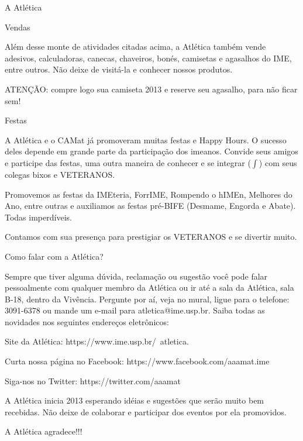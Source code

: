 \begin{secao}{A Atlética}
\begin{subsecao}{Vendas}

Além desse monte de atividades citadas acima, a Atlética também vende
adesivos, calculadoras, canecas, chaveiros, bonés, camisetas e agasalhos do IME,
 entre outros. Não deixe de visitá-la e conhecer nossos produtos.

ATENÇÃO: compre logo sua camiseta 2013 e reserve seu agasalho, para não ficar 
sem!

\end{subsecao}
\begin{subsecao}{Festas}

A Atlética e o CAMat já promoveram muitas festas e Happy Hours. O sucesso
deles depende em grande parte da participação dos imeanos. Convide seus
amigos e participe das festas, uma outra maneira de conhecer e se
integrar ($\int$) com seus colegas bixos e VETERANOS.

Promovemos as festas da IMEteria, ForrIME, Rompendo o hIMEn, Melhores do Ano, 
entre outras e auxiliamos as festas pré-BIFE (Desmame, Engorda e Abate). Todas 
imperdíveis.

Contamos com sua presença para prestigiar os VETERANOS e se divertir muito.

\end{subsecao}
\begin{subsecao}{Como falar com a Atlética?}

Sempre que tiver alguma dúvida, reclamação ou sugestão você pode falar
pessoalmente com qualquer membro da Atlética ou ir até a sala da Atlética, sala
B-18, dentro da Vivência. Pergunte por aí, veja no mural, ligue para o
telefone: 3091-6378 ou mande um e-mail para atletica@ime.usp.br.
Saiba todas as novidades nos seguintes endereços eletrônicos:

Site da Atlética: https://www.ime.usp.br/~atletica.

Curta nossa página no Facebook: https://www.facebook.com/aaamat.ime

Siga-nos no Twitter: https://twitter.com/aaamat

A Atlética inicia 2013 esperando idéias e sugestões que serão muito bem
recebidas. Não deixe de colaborar e participar dos eventos por ela promovidos.

A Atlética agradece!!!

\end{subsecao}
\end{secao}
